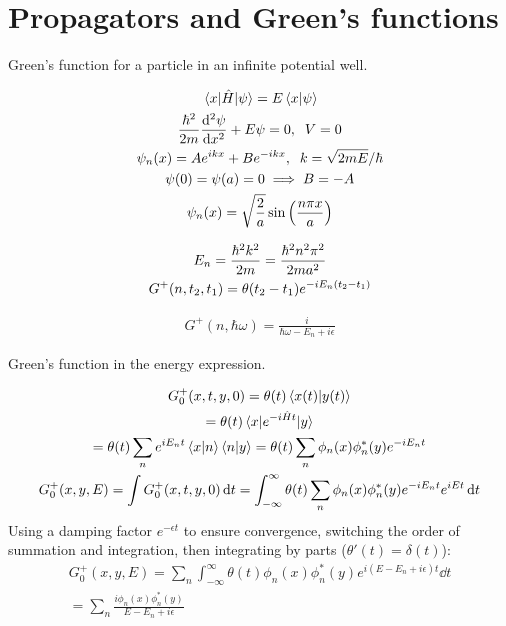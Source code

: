 \documentclass{report}
\begin{document}
\chapter{Propagators and Green's functions}
\begin{subquests}
	\item Green's function for a particle in an infinite potential well.
	\begin{subquests}
		\item
		\begin{gather*}
			\mel{x}{\hat{H}}{\psi} = E\braket{x}{\psi} \\
			\frac{\hbar^2}{2m}\dv[2]{\psi}{x} + E{\psi} = 0, \;\; V = 0 \\
			\psi_n(x) = Ae^{ikx} + Be^{-ikx},\;\;k = \sqrt{2mE}/\hbar \\
			\psi(0) = \psi(a) = 0 \implies B = -A \\
			\psi_n(x) = \sqrt{\frac{2}{a}}\sin\pqty{\frac{n\pi x}{a}}
		\end{gather*}

		\item
		\begin{gather*}
			E_n = \frac{\hbar^2k^2}{2m} = \frac{\hbar^2n^2\pi^2}{2ma^2} \\
			G^+(n,t_2,t_1) = \theta(t_2 - t_1)e^{-iE_n\pqty{t_2 - t_1}}
		\end{gather*}

		\item
		\begin{gather*}
			G^+(n,\hbar\omega) = \frac{i}{\hbar\omega - E_n + i\epsilon}
		\end{gather*}
	\end{subquests}
	\newpage
	\item Green's function in the energy expression.
	\begin{subquests}
		\item 
		\begin{gather*}
			G^+_0(x,t,y,0) = \theta(t)\ip{x(t)}{y(t)} \\
			= \theta(t)\mel{x}{e^{-i\hat Ht}}{y} \\
			= \theta(t)\sum_n e^{iE_n t}\ip{x}{n}\ip{n}{y} = \theta(t)\sum_n\phi_{n}(x)\phi_n^*(y)e^{-iE_n t} \\
			G^+_0(x,y,E) = \int G^+_0(x,t,y,0) \dd{t} = \int_{-\infty}^{\infty} \theta(t)\sum_n\phi_{n}(x)\phi_n^*(y)e^{-iE_n t}e^{iEt} \dd{t}
		\end{gather*}
		Using a damping factor $e^{-\epsilon t}$ to ensure convergence, switching the order of summation and integration, then integrating by parts ($\theta'(t) = \delta(t)$):
		\begin{gather*}
			G^+_0(x,y,E) = \sum_n\int_{-\infty}^{\infty} \theta(t)\phi_{n}(x)\phi_n^*(y)e^{i(E - E_n + i\epsilon)t} \dd{t}\\
			= \sum_n \frac{i\phi_{n}(x)\phi_n^*(y)}{E - E_n + i\epsilon}
		\end{gather*}
		

\end{subquests}
\end{subquests}
\end{document}
